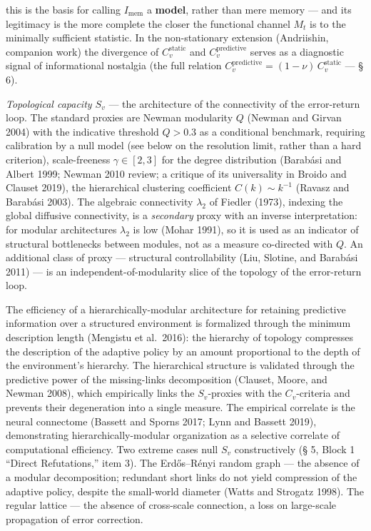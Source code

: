 \documentclass[pdflatex,sn-mathphys-ay]{sn-jnl}
\begin{document}
\begin{itemize}
this is the basis for calling \(I_{\text{mem}}\) a \textbf{model}, rather than mere memory --- and its legitimacy is the more complete the closer the functional channel \(M_t\) is to the minimally sufficient statistic. In the non-stationary extension (Andriishin, companion work) the divergence of \(C_v^{\text{static}}\) and \(C_v^{\text{predictive}}\) serves as a diagnostic signal of informational nostalgia (the full relation \(C_v^{\text{predictive}} = (1-\nu)\,C_v^{\text{static}}\) --- § 6).
\end{itemize}

\emph{Topological capacity \(S_v\)} --- the architecture of the connectivity of the error-return loop. The standard proxies are Newman modularity \(Q\) (Newman and Girvan 2004) with the indicative threshold \(Q > 0.3\) as a conditional benchmark, requiring calibration by a null model (see below on the resolution limit, rather than a hard criterion), scale-freeness \(\gamma \in [2, 3]\) for the degree distribution (Barabási and Albert 1999; Newman 2010 review; a critique of its universality in Broido and Clauset 2019), the hierarchical clustering coefficient \(C(k) \sim k^{-1}\) (Ravasz and Barabási 2003). The algebraic connectivity \(\lambda_2\) of Fiedler (1973), indexing the global diffusive connectivity, is a \emph{secondary} proxy with an inverse interpretation: for modular architectures \(\lambda_2\) is low (Mohar 1991), so it is used as an indicator of structural bottlenecks between modules, not as a measure co-directed with \(Q\). An additional class of proxy --- structural controllability (Liu, Slotine, and Barabási 2011) --- is an independent-of-modularity slice of the topology of the error-return loop.

The efficiency of a hierarchically-modular architecture for retaining predictive information over a structured environment is formalized through the minimum description length (Mengistu et al.~2016): the hierarchy of topology compresses the description of the adaptive policy by an amount proportional to the depth of the environment's hierarchy. The hierarchical structure is validated through the predictive power of the missing-links decomposition (Clauset, Moore, and Newman 2008), which empirically links the \(S_v\)-proxies with the \(C_v\)-criteria and prevents their degeneration into a single measure. The empirical correlate is the neural connectome (Bassett and Sporns 2017; Lynn and Bassett 2019), demonstrating hierarchically-modular organization as a selective correlate of computational efficiency. Two extreme cases null \(S_v\) constructively (§ 5, Block 1 ``Direct Refutations,'' item 3). The Erdős--Rényi random graph --- the absence of a modular decomposition; redundant short links do not yield compression of the adaptive policy, despite the small-world diameter (Watts and Strogatz 1998). The regular lattice --- the absence of cross-scale connection, a loss on large-scale propagation of error correction.
\end{document}
